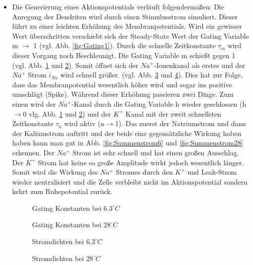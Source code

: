 \documentclass[conference]{IEEEtran}
\begin{document}
\begin{itemize}
\item Die Generierung eines Aktionspotentials verläuft folgendermaßen: Die Anregung der Dendriten wird durch einen Stimulusstrom simuliert. Dieser führt zu einer leichten Erhöhung des Membranpotentials. Wird ein gewisser Wert überschritten verschiebt sich der Steady-State Wert der Gating Variable m $\rightarrow$ 1 (vgl. Abb. \ref{fig:Gating1}). Durch die schnelle Zeitkonstante $\tau_m$ wird dieser Vorgang noch Beschleunigt. Die Gating Variable m schießt gegen 1 (vgl. Abb. \ref{fig:Gating6} und \ref{fig:Gating28}). Somit öffnet sich der $Na^+$-Ionenkanal als erstes und der $Na^+$ Strom $i_{Na}$ wird schnell größer. (vgl. Abb. \ref{fig:Stromdichten6} und \ref{fig:Stromdichten28}). Dies hat zur Folge, dass das Membranpotential wesentlich höher wird und sogar ins positive umschlägt (Spike). Während dieser Erhöhung passieren zwei Dinge. Zum einen wird der $Na^+$-Kanal durch die Gating Variable h wieder geschlossen (h$\rightarrow$0 vlg. Abb. \ref{fig:Gating6} und \ref{fig:Gating28}) und der $K^+$ Kanal mit der zweit schnellsten Zeitkonstante $\tau_n$ wird aktiv (n$\rightarrow$1). Das zuerst der Natriumstrom und dann der Kaliumstrom auftritt und der beide eine gegensätzliche Wirkung haben haben kann man gut in Abb. \ref{fig:Summenstrom6} und \ref{fig:Summenstrom28} erkennen. Der $Na^+$ Strom ist sehr schnell und hat einen großen Ausschlag. Der $K^+$ Strom hat keine so große Amplitude wirkt jedoch wesentlich länger. Somit wird die Wirkung des $Na^+$ Stromes durch den $K^+$ und Leak-Strom wieder neutralisiert und die Zelle verbleibt nicht im Aktionspotential sondern kehrt zum Ruhepotential zurück. 
\begin{figure}[h!]
  	\centering
    \scalebox{.6}{}
    \caption{Gating Konstanten bei $6.3^\circ C$}
    \label{fig:Gating6}
\end{figure}
\begin{figure}[h!]
  	\centering
    \scalebox{.6}{}
    \caption{Gating Konstanten bei $28^\circ C$}
    \label{fig:Gating28}
\end{figure}

\begin{figure}[h!]
  	\centering
    \scalebox{.6}{}
    \caption{Stromdichten bei $6.3^\circ C$}
    \label{fig:Stromdichten6}
\end{figure}
\begin{figure}[h!]
  	\centering
    \scalebox{.6}{}
    \caption{Stromdichten bei $28^\circ C$}
    \label{fig:Stromdichten28}
\end{figure}


\end{itemize}
\end{document}
